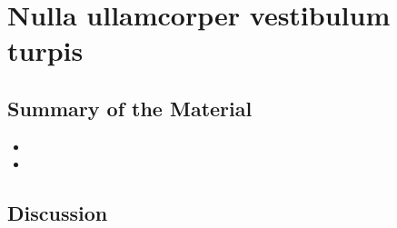 \section{Nulla ullamcorper vestibulum turpis}
\label{sec:nulla}

\subsection{Summary of the Material}
\lipsum[2]

\begin{itemize}
	\item \lipsum[1]
	\item \lipsum[2]
\end{itemize}

\lipsum[3]

\subsection{Discussion}
\lipsum[4-6]
